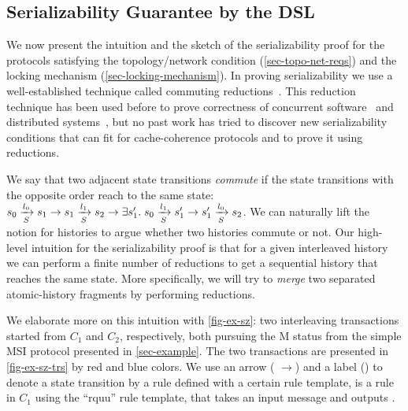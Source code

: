\documentclass[sigplan,10pt,review,anonymous,screen]{acmart}\settopmatter{printfolios=true,printccs=false,printacmref=false}
\begin{document}
\subsection{Serializability Guarantee by the \hemiola{} DSL}

We now present the intuition and the sketch of the serializability proof for the protocols satisfying the topology/network condition (\autoref{sec-topo-net-reqs}) and the locking mechanism (\autoref{sec-locking-mechanism}).
In proving serializability we use a well-established technique called commuting reductions~\cite{reduction}.
This reduction technique has been used before to prove correctness of concurrent software~\cite{Chajed:2018} and distributed systems~\cite{Hawblitzel:2015,Hawblitzel:2017}, but no past work has tried to discover new serializability conditions that can fit for cache-coherence protocols and to prove it using reductions.

We say that two adjacent state transitions \emph{commute} if the state transitions with the opposite order reach to the same state:
$\semstep{S}{s_0}{l_0}{s_1} \to \semstep{S}{s_1}{l_1}{s_2} \to \exists s_1'.\; \semstep{S}{s_0}{l_1}{s_1'} \to \semstep{S}{s_1'}{l_0}{s_2}$.
We can naturally lift the notion for histories to argue whether two histories commute or not.
Our high-level intuition for the serializability proof is that for a given interleaved history we can perform a finite number of reductions to get a sequential history that reaches the same state.
More specifically, we will try to \emph{merge} two separated atomic-history fragments by performing reductions.

We elaborate more on this intuition with \autoref{fig-ex-sz}: two interleaving transactions started from $C_1$ and $C_2$, respectively, both pursuing the M status from the simple MSI protocol presented in \autoref{sec-example}.
The two transactions are presented in \autoref{fig-ex-sz-trs} by {\color{myred} red} and {\color{myblue} blue} colors.
We use an arrow ({\color{myred} $\to$}) and a label () to denote a state transition by a rule defined with a certain rule template, \eg{}  is a rule in $C_1$ using the ``rquu'' rule template, that takes an input message  and outputs .
\end{document}
